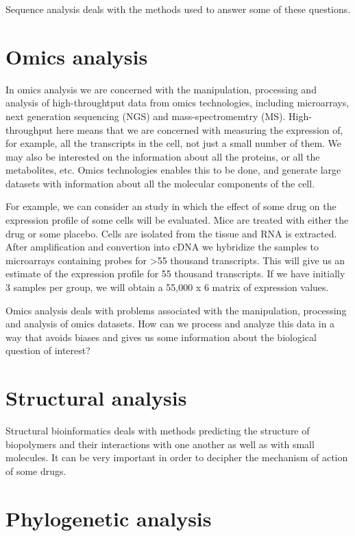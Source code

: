 \documentclass[]{book}
\theoremstyle{definition}
\theoremstyle{definition}
\theoremstyle{definition}
\theoremstyle{remark}
\begin{document}
Sequence analysis deals with the methods used to answer some of these
questions.

\section{Omics analysis}\label{omics-analysis}

In omics analysis we are concerned with the manipulation, processing and
analysis of high-throughtput data from omics technologies, including
microarrays, next generation sequencing (NGS) and mass-spectromemtry
(MS). High-throughput here means that we are concerned with measuring
the expression of, for example, all the transcripts in the cell, not
just a small number of them. We may also be interested on the
information about all the proteins, or all the metabolites, etc. Omics
technologies enables this to be done, and generate large datasets with
information about all the molecular components of the cell.

For example, we can consider an study in which the effect of some drug
on the expression profile of some cells will be evaluated. Mice are
treated with either the drug or some placebo. Cells are isolated from
the tissue and RNA is extracted. After amplification and convertion into
cDNA we hybridize the samples to microarrays containing probes for
\textgreater{}55 thousand transcripts. This will give us an estimate of
the expression profile for 55 thousand transcripts. If we have initially
3 samples per group, we will obtain a 55,000 x 6 matrix of expression
values.

Omics analysis deals with problems associated with the manipulation,
processing and analysis of omics datasets. How can we process and
analyze this data in a way that avoids biases and gives us some
information about the biological question of interest?

\section{Structural analysis}\label{structural-analysis}

Structural bioinformatics deals with methods predicting the structure of
biopolymers and their interactions with one another as well as with
small molecules. It can be very important in order to decipher the
mechanism of action of some drugs.

\section{Phylogenetic analysis}\label{phylogenetic-analysis}
\end{document}
